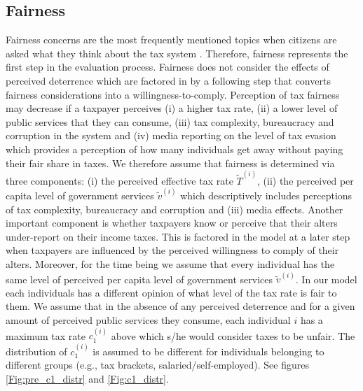 \documentclass{NSF_proposal_mod}
\begin{document}




\subsection{Fairness}
\label{Sec:fairness}
Fairness concerns are the most frequently mentioned topics when citizens are asked what they think about the tax system \cite{Kirchler2007}. Therefore, fairness represents the first step in the evaluation process. Fairness does not consider the effects of perceived deterrence which are factored in by a following step that converts fairness considerations into a willingness-to-comply. 
Perception of tax fairness may decrease if a taxpayer perceives (i) a higher tax rate, (ii) a lower level of public services that they can consume,  (iii) tax complexity, bureaucracy and corruption in the system and (iv) media reporting on the level of tax evasion which provides a perception of how many individuals get away without paying their fair share in taxes.  We therefore assume that fairness is determined via three components: (i) the perceived effective tax rate $\tilde{T}^{(i)}$, (ii) the perceived per capita level of government services $\tilde{v}^{(i)}$ which descriptively includes perceptions of  tax complexity, bureaucracy and corruption and (iii) media effects. Another important component is whether taxpayers know or perceive that their alters under-report on their income taxes. This is factored in the model at a later step when taxpayers are influenced by the perceived willingness to comply of their alters. Moreover, for the time being we assume that every individual has the same level of perceived per capita level of government services $\tilde{v}^{(i)}$.  In our model each individuals has a different opinion of what level of the tax rate is fair to them. We assume that in the absence of any perceived deterrence and for a given amount of perceived public services they consume, each individual $i$ has a maximum tax rate $c_1^{(i)}$ above which s/he would consider taxes to be unfair.  The distribution of  $c_1^{(i)}$ is assumed to be different for individuals belonging to different groups (e.g., tax brackets, salaried/self-employed). See figures \ref{Fig:pre_c1_distr} and \ref{Fig:c1_distr}. 
\end{document}
